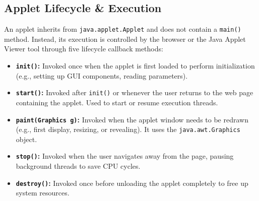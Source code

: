 \documentclass[12pt,a4paper]{article}
\begin{document}
\subsection{Applet Lifecycle \& Execution}
An applet inherits from \texttt{java.applet.Applet} and does not contain a \texttt{main()} method. Instead, its execution is controlled by the browser or the Java Applet Viewer tool through five lifecycle callback methods:
\begin{itemize}[leftmargin=*, itemsep=4pt]
  \item \textbf{\texttt{init()}:} Invoked once when the applet is first loaded to perform initialization (e.g., setting up GUI components, reading parameters).
  \item \textbf{\texttt{start()}:} Invoked after \texttt{init()} or whenever the user returns to the web page containing the applet. Used to start or resume execution threads.
  \item \textbf{\texttt{paint(Graphics g)}:} Invoked when the applet window needs to be redrawn (e.g., first display, resizing, or revealing). It uses the \texttt{java.awt.Graphics} object.
  \item \textbf{\texttt{stop()}:} Invoked when the user navigates away from the page, pausing background threads to save CPU cycles.
  \item \textbf{\texttt{destroy()}:} Invoked once before unloading the applet completely to free up system resources.
\end{itemize}
\end{document}
